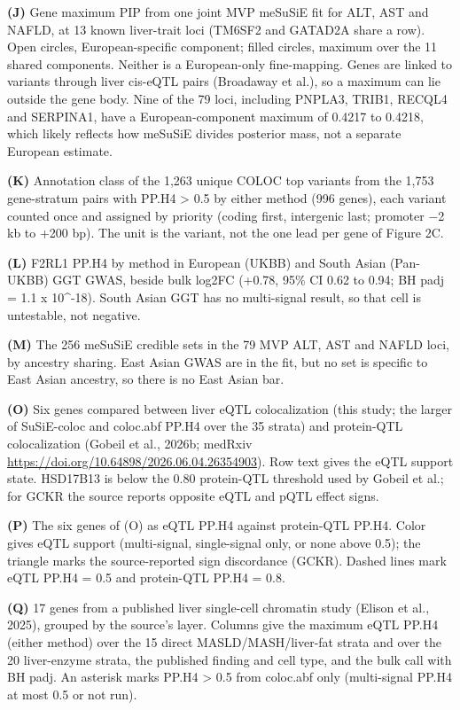 \textbf{(J)} Gene maximum PIP from one joint MVP meSuSiE fit for ALT, AST and NAFLD, at 13 known liver-trait loci (TM6SF2 and GATAD2A share a row). Open circles, European-specific component; filled circles, maximum over the 11 shared components. Neither is a European-only fine-mapping. Genes are linked to variants through liver cis-eQTL pairs (Broadaway et al.), so a maximum can lie outside the gene body. Nine of the 79 loci, including PNPLA3, TRIB1, RECQL4 and SERPINA1, have a European-component maximum of 0.4217 to 0.4218, which likely reflects how meSuSiE divides posterior mass, not a separate European estimate.

\textbf{(K)} Annotation class of the 1,263 unique COLOC top variants from the 1,753 gene-stratum pairs with PP.H4 \textgreater{} 0.5 by either method (996 genes), each variant counted once and assigned by priority (coding first, intergenic last; promoter −2 kb to +200 bp). The unit is the variant, not the one lead per gene of Figure 2C.

\textbf{(L)} F2RL1 PP.H4 by method in European (UKBB) and South Asian (Pan-UKBB) GGT GWAS, beside bulk log2FC (+0.78, 95\% CI 0.62 to 0.94; BH padj = 1.1 x 10\^{}-18). South Asian GGT has no multi-signal result, so that cell is untestable, not negative.

\textbf{(M)} The 256 meSuSiE credible sets in the 79 MVP ALT, AST and NAFLD loci, by ancestry sharing. East Asian GWAS are in the fit, but no set is specific to East Asian ancestry, so there is no East Asian bar.

\textbf{(O)} Six genes compared between liver eQTL colocalization (this study; the larger of SuSiE-coloc and coloc.abf PP.H4 over the 35 strata) and protein-QTL colocalization (Gobeil et al., 2026b; medRxiv \url{https://doi.org/10.64898/2026.06.04.26354903}). Row text gives the eQTL support state. HSD17B13 is below the 0.80 protein-QTL threshold used by Gobeil et al.; for GCKR the source reports opposite eQTL and pQTL effect signs.

\textbf{(P)} The six genes of (O) as eQTL PP.H4 against protein-QTL PP.H4. Color gives eQTL support (multi-signal, single-signal only, or none above 0.5); the triangle marks the source-reported sign discordance (GCKR). Dashed lines mark eQTL PP.H4 = 0.5 and protein-QTL PP.H4 = 0.8.

\textbf{(Q)} 17 genes from a published liver single-cell chromatin study (Elison et al., 2025), grouped by the source's layer. Columns give the maximum eQTL PP.H4 (either method) over the 15 direct MASLD/MASH/liver-fat strata and over the 20 liver-enzyme strata, the published finding and cell type, and the bulk call with BH padj. An asterisk marks PP.H4 \textgreater{} 0.5 from coloc.abf only (multi-signal PP.H4 at most 0.5 or not run).

